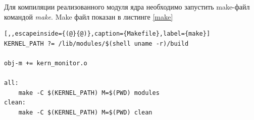 Для компиляции реализованного модуля ядра необходимо запустить
make-файл командой \textit{make}. Make файл показан в листинге \ref{make}

\begin{lstlisting}[,,escapeinside={(@}{@)},caption={Makefile},label={make}]
KERNEL_PATH ?= /lib/modules/$(shell uname -r)/build

obj-m += kern_monitor.o

all:
	make -C $(KERNEL_PATH) M=$(PWD) modules
clean:
	make -C $(KERNEL_PATH) M=$(PWD) clean
\end{lstlisting}

